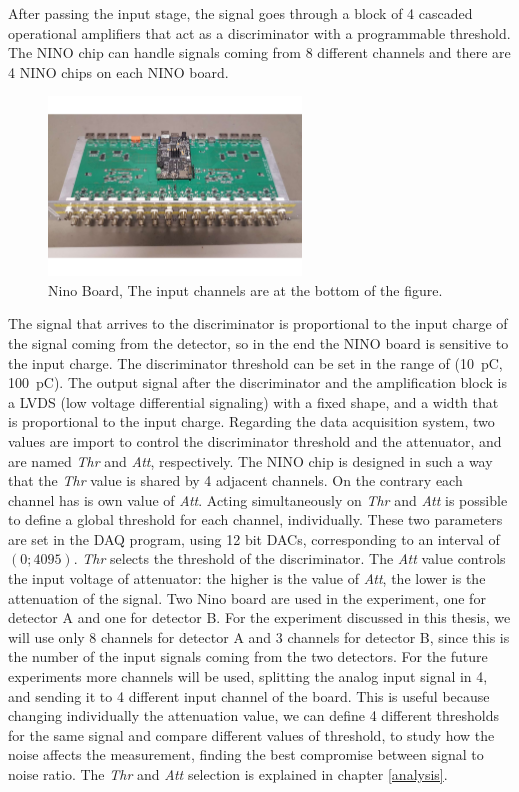 After passing the input stage, the signal goes through a block of 4 cascaded operational amplifiers that act as a discriminator with a programmable threshold. The NINO chip can handle signals coming from $8$ different channels and there are 4 NINO chips on each NINO board. 

\begin{figure}[!ht]
\centering
\includegraphics[width = 0.6\textwidth]{ExperimentalSetup/NINO.pdf}
\caption{Nino Board, The input channels are at the bottom of the figure.}
\label{fig:NinoBoard}
\end{figure}
\newpage
The signal that arrives to the discriminator is proportional to the input charge of the signal coming from the detector, so in the end the NINO board is sensitive to the input charge. The discriminator threshold can be set in the range of (\SI{10}{\pico \coulomb}, \SI{100}{\pico \coulomb}). 
The output signal after the discriminator and the amplification block is a LVDS (low voltage differential signaling) with a fixed shape, and a width that is proportional to the input charge. Regarding the data acquisition system, two values are import to control the discriminator threshold and the attenuator, and are named \textit{Thr} and \textit{Att}, respectively. The NINO chip is designed in such a way that the \textit{Thr} value is shared by 4 adjacent channels. On the contrary each channel has is own value of \textit{Att}. Acting simultaneously on \textit{Thr} and \textit{Att} is possible to define a global threshold for each channel, individually.
These two parameters are set in the DAQ program, using 12 bit DACs, corresponding to an interval of $(0 ; 4095)$. \textit{Thr} selects the threshold of the discriminator. The \textit{Att} value controls the input voltage of attenuator: the higher is the value of \textit{Att}, the lower is the attenuation of the signal.
Two Nino board are used in the experiment, one for detector A and one for detector B. For the experiment discussed in this thesis, we will use only 8 channels for detector A and 3 channels for detector B, since this is the number of the input signals coming from the two detectors. For the future experiments more channels will be used, splitting the analog input signal in 4, and sending it to 4 different input channel of the board. This is useful because changing individually the attenuation value, we can define 4 different thresholds for the same signal and compare different values of threshold, to study how the noise affects the measurement, finding the best compromise between signal to noise ratio. The \textit{Thr} and \textit{Att} selection is explained in chapter \ref{analysis}.



